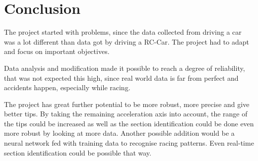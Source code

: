 \chapter{Conclusion}
The project started with problems, since the data collected from driving a car was a lot different than data got by driving a RC-Car. The project had to adapt and focus on important objectives.

Data analysis and modification made it possible to reach a degree of reliability, that was not expected this high, since real world data is far from perfect and accidents happen, especially while racing.

The project has great further potential to be more robust, more precise and give better tips. By taking the remaining acceleration axis into account, the range of the tips could be increased as well as the section identification could be done even more robust by looking at more data. Another possible addition would be a neural network fed with training data to recognise racing patterns. Even real-time section identification could be possible that way. 
